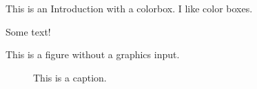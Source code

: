 This is an Introduction with a colorbox. I like color boxes.
\vspace{1em}
\begin{tcolorbox}[title=Some Title!]
  Some text!
\end{tcolorbox}

This is a figure without a graphics input.
\begin{figure}[!h]
  \centering
  \caption{This is a caption.}
  \label{fig:test_figure}
\end{figure}
